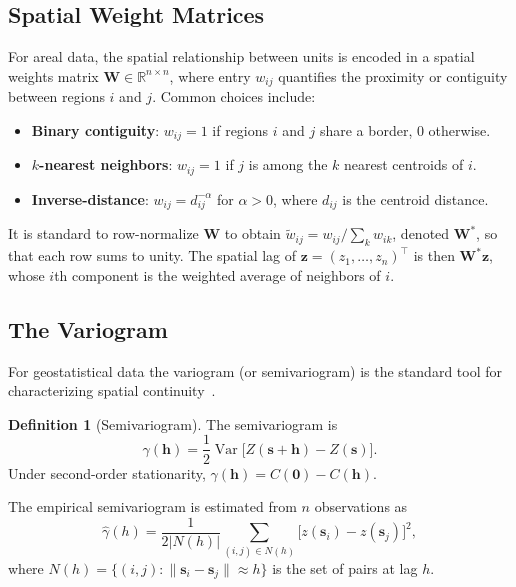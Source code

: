 \documentclass[conference]{IEEEtran}
\theoremstyle{definition}
\newtheorem{definition}{Definition}
\begin{document}
\subsection{Spatial Weight Matrices}

For areal data, the spatial relationship between units is encoded in a spatial weights matrix $\mathbf{W} \in \mathbb{R}^{n \times n}$, where entry $w_{ij}$ quantifies the proximity or contiguity between regions $i$ and $j$. Common choices include:

\begin{itemize}
  \item \textbf{Binary contiguity}: $w_{ij} = 1$ if regions $i$ and $j$ share a border, 0 otherwise.
  \item \textbf{$k$-nearest neighbors}: $w_{ij} = 1$ if $j$ is among the $k$ nearest centroids of $i$.
  \item \textbf{Inverse-distance}: $w_{ij} = d_{ij}^{-\alpha}$ for $\alpha > 0$, where $d_{ij}$ is the centroid distance.
\end{itemize}

It is standard to row-normalize $\mathbf{W}$ to obtain $\tilde{w}_{ij} = w_{ij} / \sum_k w_{ik}$, denoted $\mathbf{W}^*$, so that each row sums to unity. The spatial lag of $\mathbf{z} = (z_1, \ldots, z_n)^\top$ is then $\mathbf{W}^*\mathbf{z}$, whose $i$th component is the weighted average of neighbors of $i$.

\subsection{The Variogram}

For geostatistical data the variogram (or semivariogram) is the standard tool for characterizing spatial continuity~\cite{matheron1963}.

\begin{definition}[Semivariogram]
The semivariogram is
\[
\gamma(\mathbf{h}) = \frac{1}{2}\operatorname{Var}\!\bigl[Z(\mathbf{s}+\mathbf{h}) - Z(\mathbf{s})\bigr].
\]
Under second-order stationarity, $\gamma(\mathbf{h}) = C(\mathbf{0}) - C(\mathbf{h})$.
\end{definition}

The empirical semivariogram is estimated from $n$ observations as
\begin{equation}
\hat{\gamma}(h) = \frac{1}{2|N(h)|} \sum_{(i,j)\in N(h)} \bigl[z(\mathbf{s}_i) - z(\mathbf{s}_j)\bigr]^2,
\label{eq:empirical_variogram}
\end{equation}
where $N(h) = \{(i,j) : \|\mathbf{s}_i - \mathbf{s}_j\| \approx h\}$ is the set of pairs at lag $h$.
\end{document}
